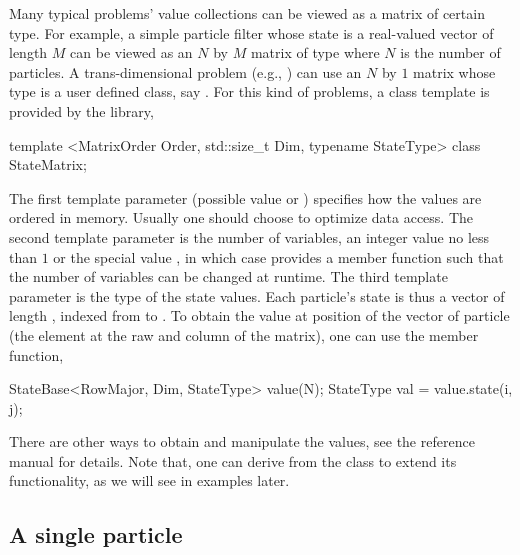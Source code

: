 Many typical problems' value collections can be viewed as a matrix of certain
type. For example, a simple particle filter whose state is a real-valued
vector of length $M$ can be viewed as an $N$ by $M$ matrix of type
 where $N$ is the number of particles. A trans-dimensional
problem (e.g., \cite{Jasra:2008bb}) can use an $N$ by $1$ matrix whose type is
a user defined class, say . For this kind of problems,
a class template is provided by the library,
\begin{cppcode}
template <MatrixOrder Order, std::size_t Dim, typename StateType>
class StateMatrix;
\end{cppcode}
The first template parameter (possible value  or
) specifies how the values are ordered in memory. Usually
one should choose  to optimize data access. The second
template parameter is the number of variables, an integer value no less than
$1$ or the special value , in which case
 provides a member function  such
that the number of variables can be changed at runtime. The third template
parameter is the type of the state values. Each particle's state is thus a
vector of length , indexed from  to . To obtain the value at position  of the vector of
particle  (the element at the \xth raw and
\xth column of the matrix), one can use the 
member function,
\begin{cppcode}
StateBase<RowMajor, Dim, StateType> value(N);
StateType val = value.state(i, j);
\end{cppcode}
There are other ways to obtain and manipulate the values, see the reference
manual for details. Note that, one can derive from the 
class to extend its functionality, as we will see in examples later.

\subsection{A single particle}
\label{sub:A single particle}

